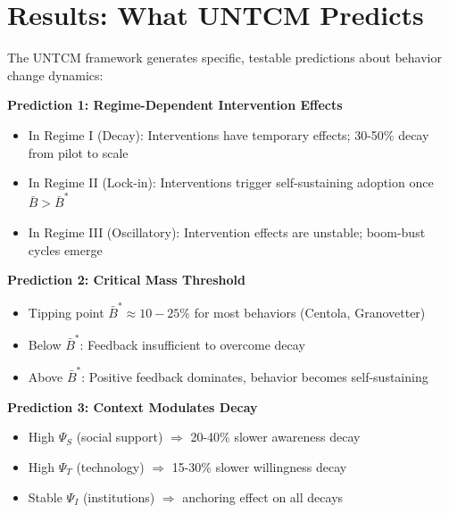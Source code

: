 
\section{Results: What UNTCM Predicts}
\label{sec:untcm-results}

The UNTCM framework generates specific, testable predictions about behavior change dynamics:

\begin{tcolorbox}[colback=purple!5!white, colframe=purple!75!black,
    title=\textbf{Key Predictions from UNTCM}]

\textbf{Prediction 1: Regime-Dependent Intervention Effects}
\begin{itemize}[nosep]
\item In Regime I (Decay): Interventions have temporary effects; 30-50\% decay from pilot to scale
\item In Regime II (Lock-in): Interventions trigger self-sustaining adoption once $\bar{B} > \bar{B}^*$
\item In Regime III (Oscillatory): Intervention effects are unstable; boom-bust cycles emerge
\end{itemize}

\textbf{Prediction 2: Critical Mass Threshold}
\begin{itemize}[nosep]
\item Tipping point $\bar{B}^* \approx 10-25\%$ for most behaviors (Centola, Granovetter)
\item Below $\bar{B}^*$: Feedback insufficient to overcome decay
\item Above $\bar{B}^*$: Positive feedback dominates, behavior becomes self-sustaining
\end{itemize}

\textbf{Prediction 3: Context Modulates Decay}
\begin{itemize}[nosep]
\item High $\Psi_S$ (social support) $\Rightarrow$ 20-40\% slower awareness decay
\item High $\Psi_T$ (technology) $\Rightarrow$ 15-30\% slower willingness decay
\item Stable $\Psi_I$ (institutions) $\Rightarrow$ anchoring effect on all decays
\end{itemize}


\end{tcolorbox}
